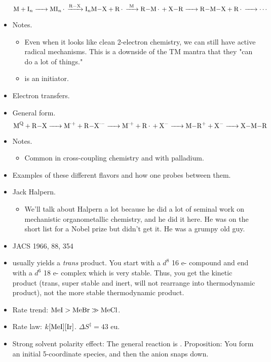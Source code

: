 \documentclass[../notes.tex]{subfiles}
\begin{document}
\begin{itemize}
\begin{equation*}
        \ce{M + I_n -> MI_n* ->[R-X] I_nM-X + R* ->[M] R-M* + X-R -> R-M-X + R* -> \cdots}
    \end{equation*}
    \item Notes.
    \begin{itemize}
        \item Even when it looks like clean 2-electron chemistry, we can still have active radical mechanisms. This is a downside of the TM mantra that they "can do a lot of things."
        \item {} is an initiator.
    \end{itemize}
    \item Electron transfers.
    \item General form.
    \begin{equation*}
        \ce{M^Q + R-X -> M^{\cdot +} + R-X^{\cdot -} -> M^{\cdot +} + R* + X- -> M-R+ + X- -> X-M-R}
    \end{equation*}
    \item Notes.
    \begin{itemize}
        \item Common in cross-coupling chemistry and with palladium.
    \end{itemize}
    \item Examples of these different flavors and how one probes between them.
    \item Jack Halpern.
    \begin{itemize}
        \item We'll talk about Halpern a lot because he did a lot of seminal work on mechanistic organometallic chemistry, and he did it here. He was on the short list for a Nobel prize but didn't get it. He was a grumpy old guy.
    \end{itemize}
    \item JACS 1966, 88, 354
    \item {} usually yields a \emph{trans} product. You start with a $d^8$ 16 e- compound and end with a $d^6$ 18 e- complex which is very stable. Thus, you get the kinetic product (trans, super stable and inert, will not rearrange into thermodynamic product), not the more stable thermodynamic product.
    \item Rate trend: $\ce{MeI}>\ce{MeBr}\gg\ce{MeCl}$.
    \item Rate law: $k[\ce{MeI}][\ce{Ir}]$. $\Delta S^\ddagger=43$ eu.
    \item Strong solvent polarity effect: The general reaction is . Proposition: You form an initial 5-coordinate species, and then the anion snaps down.

\end{itemize}
\end{document}
